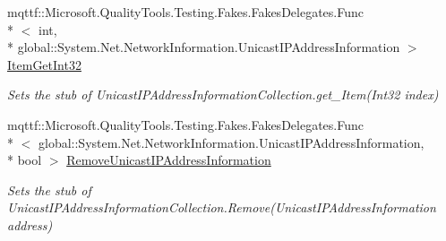 \begin{DoxyCompactItemize}
mqttf\-::\-Microsoft.\-Quality\-Tools.\-Testing.\-Fakes.\-Fakes\-Delegates.\-Func\\*
$<$ int, \\*
global\-::\-System.\-Net.\-Network\-Information.\-Unicast\-I\-P\-Address\-Information $>$ \hyperlink{class_system_1_1_net_1_1_network_information_1_1_fakes_1_1_stub_unicast_i_p_address_information_collection_a4da7763e80708241ede28ae0f0805029}{Item\-Get\-Int32}
\begin{DoxyCompactList}\small\item\em Sets the stub of Unicast\-I\-P\-Address\-Information\-Collection.\-get\-\_\-\-Item(\-Int32 index)\end{DoxyCompactList}\item 
mqttf\-::\-Microsoft.\-Quality\-Tools.\-Testing.\-Fakes.\-Fakes\-Delegates.\-Func\\*
$<$ global\-::\-System.\-Net.\-Network\-Information.\-Unicast\-I\-P\-Address\-Information, \\*
bool $>$ \hyperlink{class_system_1_1_net_1_1_network_information_1_1_fakes_1_1_stub_unicast_i_p_address_information_collection_a7bd36c04089d01eaa52807cbf6ba32ed}{Remove\-Unicast\-I\-P\-Address\-Information}
\begin{DoxyCompactList}\small\item\em Sets the stub of Unicast\-I\-P\-Address\-Information\-Collection.\-Remove(\-Unicast\-I\-P\-Address\-Information address)\end{DoxyCompactList}\end{DoxyCompactItemize}
